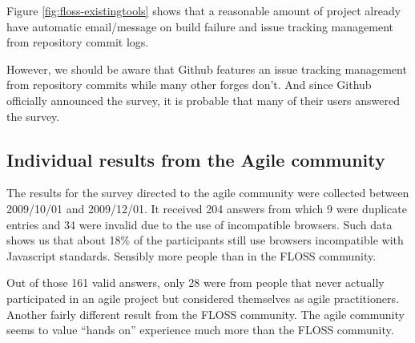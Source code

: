 \documentclass[lnbip]{svmultln}
\begin{document}
Figure \ref{fig:floss-existingtools} shows that a reasonable amount of
project already have automatic email/message on build failure and
issue tracking management from repository commit logs.

However, we should be aware that Github features an issue tracking
management from repository commits while many other forges don't. And
since Github officially announced the survey, it is probable that many
of their users answered the survey.

\subsection{Individual results from the Agile community}
\label{subsec:agile-results}

The results for the survey directed to the agile community were
collected between 2009/10/01 and 2009/12/01. It received 204 answers
from which 9 were duplicate entries and 34 were invalid due to the use
of incompatible browsers. Such data shows us that about 18\% of the
participants still use browsers incompatible with Javascript
standards. Sensibly more people than in the FLOSS community.

Out of those 161 valid answers, only 28 were from people that never
actually participated in an agile project but considered themselves
as agile practitioners. Another fairly different result from the FLOSS
community. The agile community seems to value ``hands on'' experience
much more than the FLOSS community.
\end{document}
